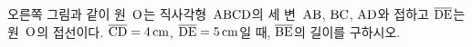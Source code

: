 \noindent\begin{minipage}[t]{0.58\linewidth}\vspace{0pt}\raggedright 오른쪽 그림과 같이 원~$\mathrm{O}$는 직사각형~$\mathrm{ABCD}$의 세 변~$\mathrm{AB}$, $\mathrm{BC}$, $\mathrm{AD}$와 접하고 $\overline{\mathrm{DE}}$는 원~$\mathrm{O}$의 접선이다. $\overline{\mathrm{CD}}=4\,\mathrm{cm}$, $\overline{\mathrm{DE}}=5\,\mathrm{cm}$일 때, $\overline{\mathrm{BE}}$의 길이를 구하시오.\end{minipage}\hfill\begin{minipage}[t]{0.4\linewidth}\vspace{0pt}\centering \resizebox{\ifdim\width>\linewidth\linewidth\else\width\fi}{!}{}\end{minipage}\par
